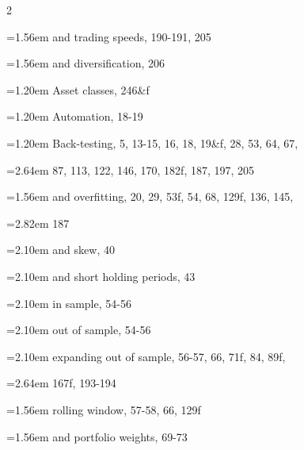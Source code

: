 {\begin{multicols}{2}
\par \noindent\hangindent=1.56em\hspace*{0.36em} and trading speeds, 190-191, 205
\par \noindent\hangindent=1.56em\hspace*{0.36em} and diversification, 206
\par \noindent\hangindent=1.20em\hspace*{0.00em} Asset classes, 246\&f
\par \noindent\hangindent=1.20em\hspace*{0.00em} Automation, 18-19
\par \noindent\hangindent=1.20em\hspace*{0.00em} Back-testing, 5, 13-15, 16, 18, 19\&f, 28, 53, 64, 67,
\par \noindent\hangindent=2.64em\hspace*{1.44em} 87, 113, 122, 146, 170, 182f, 187, 197, 205
\par \noindent\hangindent=1.56em\hspace*{0.36em} and overfitting, 20, 29, 53f, 54, 68, 129f, 136, 145,
\par \noindent\hangindent=2.82em\hspace*{1.62em} 187
\par \noindent\hangindent=2.10em\hspace*{0.90em} and skew, 40
\par \noindent\hangindent=2.10em\hspace*{0.90em} and short holding periods, 43
\par \noindent\hangindent=2.10em\hspace*{0.90em} in sample, 54-56
\par \noindent\hangindent=2.10em\hspace*{0.90em} out of sample, 54-56
\par \noindent\hangindent=2.10em\hspace*{0.90em} expanding out of sample, 56-57, 66, 71f, 84, 89f,
\par \noindent\hangindent=2.64em\hspace*{1.44em} 167f, 193-194
\par \noindent\hangindent=1.56em\hspace*{0.36em} rolling window, 57-58, 66, 129f
\par \noindent\hangindent=1.56em\hspace*{0.36em} and portfolio weights, 69-73

\end{multicols}}
